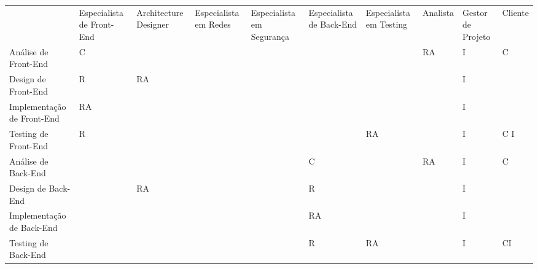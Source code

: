 \documentclass[a4paper]{report}
\begin{document}
\begin{table}[h]
\centering
\begin{adjustbox}{width=1.3\textwidth, center=\textwidth}
\label{my-label}
\begin{tabular}{l|l|l|l|l|l|l|l|l|l}
                                    & Especialista de Front-End & Architecture Designer & Especialista em Redes & Especialista em Segurança & Especialista de Back-End & Especialista em Testing & Analista & Gestor de Projeto & Cliente \\
Análise de Front-End                & C                         &                       &                       &                           &                          &                         & RA       & I                 &C         \\
Design de Front-End                 & R                       & RA                    &                       &                           &                          &                         &          & I                 &         \\
Implementação de Front-End          & RA                        &                       &                       &                           &                          &                         &          & I                 &         \\
Testing de Front-End                & R                     &                       &                       &                           &                          & RA                      &          & I                 &C I       \\
Análise de Back-End                 &                           &                       &                       &                           & C                        &                         & RA       & I                 & C        \\
Design de Back-End                  &                           & RA                    &                       &                           & R                      &                         &          & I                 &         \\
Implementação de Back-End           &                           &                       &                       &                           & RA                       &                         &          & I                 &         \\
Testing de Back-End                 &                           &                       &                       &                           & R                       & RA                      &          & I                 & CI       \\

\end{tabular}
\end{adjustbox}
\end{table}
\end{document}
